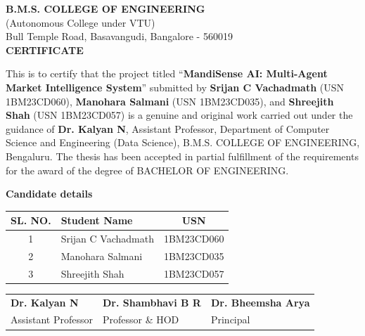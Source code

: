 \documentclass[12pt,a4paper]{report}
\newcommand{\CollegeName}{B.M.S. COLLEGE OF ENGINEERING}
\newcommand{\CollegeSubtitle}{(Autonomous College under VTU)}
\newcommand{\CollegeAddress}{Bull Temple Road, Basavangudi, Bangalore - 560019}
\newcommand{\Department}{Department of Computer Science and Engineering (Data Science)}
\newcommand{\ProjectTitle}{MandiSense AI: Multi-Agent Market Intelligence System}
\newcommand{\Degree}{BACHELOR OF ENGINEERING}
\newcommand{\GuideName}{Dr. Kalyan N}
\newcommand{\GuideDesignation}{Assistant Professor}
\newcommand{\StudentA}{Srijan C Vachadmath}
\newcommand{\USNA}{1BM23CD060}
\newcommand{\StudentB}{Manohara Salmani}
\newcommand{\USNB}{1BM23CD035}
\newcommand{\StudentC}{Shreejith Shah}
\newcommand{\USNC}{1BM23CD057}
\begin{document}
\vspace*{1.0cm}
\begin{center}
    {\color{bmsblue}\bfseries\Large \CollegeName}\\[3pt]
    {\large \CollegeSubtitle}\\[3pt]
    {\large \CollegeAddress}\\[0.8cm]
    {\LARGE\bfseries CERTIFICATE}
\end{center}

\vspace{0.8cm}
\begin{minipage}{0.93\textwidth}
\setlength{\parindent}{1.2cm}
\setlength{\parskip}{0.45em}
\justifying
This is to certify that the project titled ``\textbf{\ProjectTitle}'' submitted by \textbf{\StudentA} (USN \USNA), \textbf{\StudentB} (USN \USNB), and \textbf{\StudentC} (USN \USNC) is a genuine and original work carried out under the guidance of \textbf{\GuideName}, \GuideDesignation, \Department, \CollegeName, Bengaluru. The thesis has been accepted in partial fulfillment of the requirements for the award of the degree of \Degree.
\end{minipage}

\vspace{1.0cm}
\begin{center}
    {\bfseries Candidate details}
\end{center}

\begin{center}
\begin{tabularx}{0.92\textwidth}{|c|X|c|}
\hline
\textbf{SL. NO.} & \textbf{Student Name} & \textbf{USN} \\
\hline
1 & \StudentA & \USNA \\
\hline
2 & \StudentB & \USNB \\
\hline
3 & \StudentC & \USNC \\
\hline
\end{tabularx}
\end{center}

\vspace{0.9cm}
\begin{center}
\begin{tabularx}{0.92\textwidth}{X X X}
\textbf{\GuideName} & \textbf{Dr. Shambhavi B R} & \textbf{Dr. Bheemsha Arya} \\
\GuideDesignation & Professor \& HOD & Principal \\
\end{tabularx}
\end{center}
\end{document}
